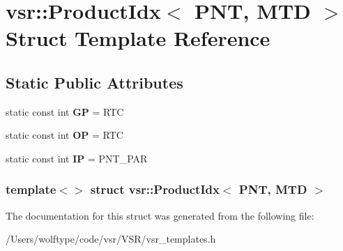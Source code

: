 \hypertarget{structvsr_1_1_product_idx_3_01_p_n_t_00_01_m_t_d_01_4}{\section{vsr\-:\-:Product\-Idx$<$ P\-N\-T, M\-T\-D $>$ Struct Template Reference}
\label{structvsr_1_1_product_idx_3_01_p_n_t_00_01_m_t_d_01_4}
}
\subsection*{Static Public Attributes}
\begin{DoxyCompactItemize}
\item 
\hypertarget{structvsr_1_1_product_idx_3_01_p_n_t_00_01_m_t_d_01_4_a4dc4493e40c94235980a95f269cc021c}{static const int {\bfseries G\-P} = R\-T\-C}\label{structvsr_1_1_product_idx_3_01_p_n_t_00_01_m_t_d_01_4_a4dc4493e40c94235980a95f269cc021c}

\item 
\hypertarget{structvsr_1_1_product_idx_3_01_p_n_t_00_01_m_t_d_01_4_ad74f74499a02bfd54aa7c82f4051ae01}{static const int {\bfseries O\-P} = R\-T\-C}\label{structvsr_1_1_product_idx_3_01_p_n_t_00_01_m_t_d_01_4_ad74f74499a02bfd54aa7c82f4051ae01}

\item 
\hypertarget{structvsr_1_1_product_idx_3_01_p_n_t_00_01_m_t_d_01_4_af4814b7e5bbacc4842bceb445941133d}{static const int {\bfseries I\-P} = P\-N\-T\-\_\-\-P\-A\-R}\label{structvsr_1_1_product_idx_3_01_p_n_t_00_01_m_t_d_01_4_af4814b7e5bbacc4842bceb445941133d}

\end{DoxyCompactItemize}
\subsubsection*{template$<$$>$ struct vsr\-::\-Product\-Idx$<$ P\-N\-T, M\-T\-D $>$}



The documentation for this struct was generated from the following file\-:\begin{DoxyCompactItemize}
\item 
/\-Users/wolftype/code/vsr/\-V\-S\-R/vsr\-\_\-templates.\-h\end{DoxyCompactItemize}
